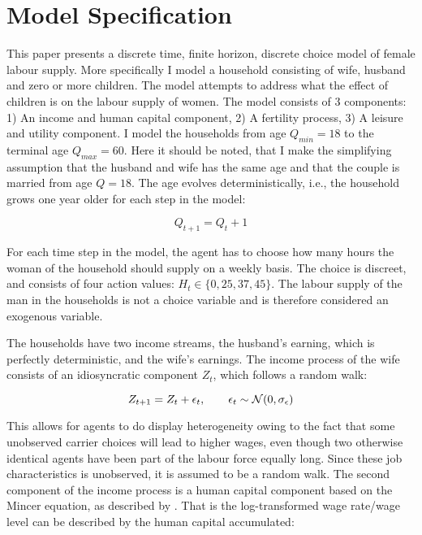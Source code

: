 \section{Model Specification}\label{sec:model1}

This paper presents a discrete time, finite horizon, discrete choice model of female labour supply. More specifically I model a household consisting of wife, husband and zero or more children. The model attempts to address what the effect of children is on the labour supply of women. The model consists of 3 components: 1) An income and human capital component, 2) A fertility process, 3) A leisure and utility component. I model the households from age $Q_{min}=18$ to the terminal age $Q_{max} = 60$. Here it should be noted, that I make the simplifying assumption that the husband and wife has the same age and that the couple is married from age $Q=18$. The age evolves deterministically, i.e., the household grows one year older for each step in the model:

\begin{equation}
    Q_{t+1} = Q_t + 1
\end{equation}

For each time step in the model, the agent has to  choose how many hours the woman of the household should supply on a weekly basis. The choice is discreet, and consists of four action values: $H_t \in \{0, 25, 37, 45 \}$. The labour supply of the man in the households is not a choice variable and is therefore considered an exogenous variable.

The households have two income streams, the husband's earning, which is perfectly deterministic, and the wife's earnings. The income process of the wife consists of an idiosyncratic component $Z_t$, which follows a random walk:

\begin{equation}
    Z_{t+1} = Z_t + \epsilon_t, \qquad \epsilon_t \sim \mathcal{N} (0, \sigma_\epsilon)
\end{equation}

This allows for agents to do display heterogeneity owing to the fact that some unobserved carrier choices will lead to higher wages, even though two otherwise identical agents have been part of the labour force equally long. Since these job characteristics is unobserved, it is assumed to be a random walk. The second component of the income process is a human capital component based on the Mincer equation, as described by \textcite{lemieux_mincer_2006}. That is the log-transformed wage rate/wage level can be described by the human capital accumulated:

